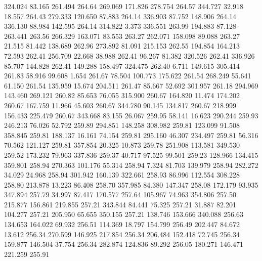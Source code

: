  324.024   83.165  261.494       264.64
 269.069  171.826  278.754       264.57
 344.727   32.918   18.557       264.43
 279.333  120.650   87.883       264.14
 336.903   87.752  148.906       264.14
 336.130   88.984  142.595       264.14
 314.822    3.373  336.551       263.99
 194.883   87.128  263.441       263.56
 266.329  163.071   83.553       263.27
 262.071  158.098   89.088       263.27
  21.515   81.442  138.689       262.96
 273.892   81.091  215.153       262.55
 194.854  164.213   72.593       262.41
 256.709   22.668   38.988       262.41
  96.267   81.382  320.526       262.41
 336.926   85.707  144.828       262.41
 149.288  158.497  324.475       262.40
   6.711  149.615  305.414       261.83
  58.916   99.608    1.654       261.67
  78.504  100.773  175.622       261.54
 268.249   55.641   61.150       261.54
 135.959   15.674  204.511       261.47
  85.667   52.692  301.957       261.18
 294.969  143.460  269.121       260.82
  85.653   76.055  315.900       260.67
 164.820   11.474  174.202       260.67
 167.759   11.966   45.603       260.67
 344.780   90.145  134.817       260.67
 218.999  156.433  225.479       260.67
 343.668   83.155   26.067       259.95
  58.141   16.623  290.244       259.93
 246.213   76.026   52.792       259.89
 294.851  148.258  308.982       259.81
 123.099   91.508  358.845       259.81
 188.137   16.161   74.154       259.81
 295.160   46.307  234.497       259.81
  56.316   70.562  121.127       259.81
 357.854   20.325   10.873       259.78
 251.908  113.581  349.530       259.52
 173.232   79.963  337.836       259.37
  40.717   97.525   99.501       259.23
 128.966  134.415  359.801       258.94
 270.363  101.176   55.314       258.94
   7.324   81.703  139.979       258.94
 282.272   34.029   24.968       258.94
 301.942  160.139  322.661       258.93
  86.996  112.554  308.228       258.80
 213.878   13.223   86.408       258.70
 357.985   84.380  147.347       258.08
 172.179   93.935  347.894       257.79
  34.997   87.417  170.577       257.64
 105.967   74.963  354.806       257.50
 215.877  156.861  219.855       257.21
 343.844   84.441   75.325       257.21
  31.887   82.201  104.277       257.21
 205.950   65.655  350.155       257.21
 138.746  153.666  340.088       256.63
 134.653  164.022   69.932       256.51
 114.369   18.797  154.799       256.49
 202.447   84.672   13.612       256.34
 270.599  146.925  217.854       256.34
 206.484  152.418   72.745       256.34
 159.877  146.504   37.754       256.34
 282.874  124.836   89.292       256.05
 180.271  146.471  221.259       255.91
